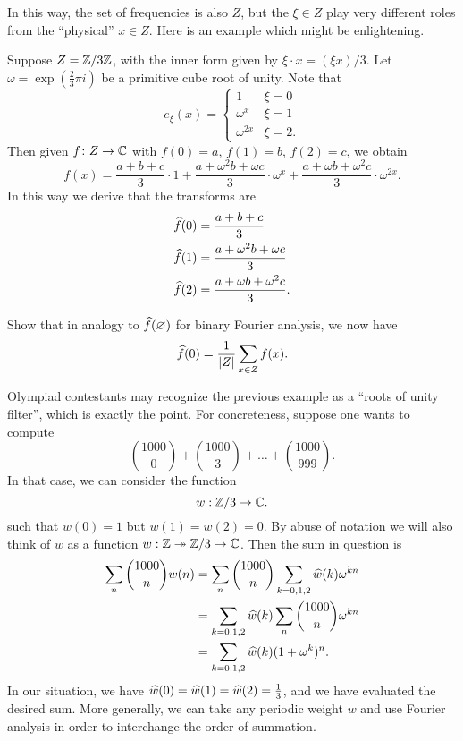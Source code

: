 In this way, the set of frequencies is also $Z$,
but the $\xi \in Z$ play very different roles from the ``physical'' $x \in Z$.
Here is an example which might be enlightening.
\begin{example}
	Suppose $Z = \mathbb Z/3\mathbb Z$, with the inner form given by $\xi \cdot x = (\xi x)/3$.
	Let $\omega = \exp(\frac 23 \pi i)$ be a primitive cube root of unity.
	Note that
	\[ e_\xi(x) = \begin{cases}
			1 & \xi = 0 \\
			\omega^x & \xi = 1 \\
			\omega^{2x} & \xi = 2.
		\end{cases} \]
	Then given $f \colon Z \to \mathbb C$ with $f(0) = a$, $f(1) = b$, $f(2) = c$,
	we obtain
	\[ f(x) = \frac{a+b+c}{3} \cdot 1
		+ \frac{a + \omega^2 b + \omega c}{3} \cdot \omega^x
		+ \frac{a + \omega b + \omega^2 c}{3} \cdot \omega^{2x}.  \]
	In this way we derive that the transforms are
	\begin{align*}
		\widehat f(0) &= \frac{a+b+c}{3} \\
		\widehat f(1) &= \frac{a+\omega^2 b+ \omega c}{3} \\
		\widehat f(2) &= \frac{a+\omega b+\omega^2c}{3}.
	\end{align*}
\end{example}
\begin{exercise}
	Show that in analogy to $\widehat f(\varnothing)$
	for binary Fourier analysis, we now have
	\[ \widehat f(0) = \frac{1}{|Z|} \sum_{x \in Z} f(x). \]
\end{exercise}
Olympiad contestants may recognize the previous example
as a ``roots of unity filter'', which is exactly the point.
For concreteness, suppose one wants to compute
\[ \binom{1000}{0} + \binom{1000}{3} + \dots + \binom{1000}{999}. \]
In that case, we can consider the function
\[ w : \mathbb Z/3 \to \mathbb C. \]
such that $w(0) = 1$ but $w(1) = w(2) = 0$.
By abuse of notation we will also think of $w$
as a function $w : \mathbb Z \twoheadrightarrow \mathbb Z/3 \to \mathbb C$.
Then the sum in question is
\begin{align*}
	\sum_n \binom{1000}{n} w(n)
	&= \sum_n \binom{1000}{n} \sum_{k=0,1,2} \widehat w(k) \omega^{kn} \\
	&= \sum_{k=0,1,2} \widehat w(k) \sum_n \binom{1000}{n} \omega^{kn} \\
	&= \sum_{k=0,1,2} \widehat w(k) (1+\omega^k)^n.
\end{align*}
In our situation, we have $\widehat w(0) = \widehat w(1) = \widehat w(2) = \frac13$,
and we have evaluated the desired sum.
More generally, we can take any periodic weight $w$
and use Fourier analysis in order to interchange the order of summation.

